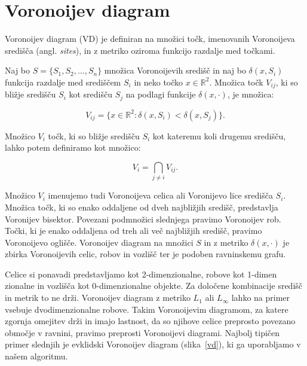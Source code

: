 \documentclass[a4paper, 12pt]{book}
\begin{document}
\section{Voronoijev diagram}
Voronoijev diagram (VD) je definiran na množici točk, imenovanih Voronoijeva središča (angl. \textit{sites}), in z metriko oziroma funkcijo razdalje med točkami.

Naj bo $S = \{S_1,S_2,...,S_n\}$ množica Voronoijevih središč in naj bo $\delta(x,S_i)$ funkcija razdalje med središčem $S_i$ in neko točko $x \in \mathbb{R}^2$. Množica točk $V_{ij}$, ki so bližje središču $S_i$ kot središču $S_j$ na podlagi funkcije $\delta(x,\cdot)$, je množica:

\begin{equation*}
V_{ij} = \{x \in \mathbb{R}^2: \delta(x,S_i) < \delta(x,S_j)\}. 
\end{equation*}

Množico $V_i$ točk, ki so bližje središču $S_i$ kot kateremu koli drugemu središču, lahko potem definiramo kot množico:

\begin{equation*}
V_i = \bigcap_{j \neq i} V_{ij} .
\end{equation*}

Množico $V_i$ imenujemo tudi Voronoijeva celica ali Voronijevo lice središča $S_i$. Množica točk, ki so enako oddaljene od dveh najbližjih središč, predstavlja Voronijev bisektor. Povezani podmnožici slednjega pravimo Voronoijev rob. Točki, ki je enako oddaljena od treh ali več najbližjih središč, pravimo Voronoijevo oglišče. Voronoijev diagram na množici $S$ in z metriko $\delta(x,\cdot)$ je zbirka Voronoijevih celic, robov in vozlišč ter je podoben ravninskemu grafu.

Celice si ponavadi predstavljamo kot 2-dimenzionalne, robove kot 1-dimen\- zionalne in vozlišča kot 0-dimenzionalne objekte. Za določene kombinacije središč in metrik to ne drži. Voronoijev diagram z metriko $L_1$ ali $L_{\infty}$ lahko na primer vsebuje dvodimenzionalne robove. Takim Voronoijevim diagramom, za katere zgornja omejitev drži in imajo lastnost, da so njihove celice preprosto povezano območje v ravnini, pravimo preprosti Voronoijevi diagrami. Najbolj tipičen primer slednjih je evklidski Voronoijev diagram (slika~\ref{vd}), ki ga uporabljamo v našem algoritmu.
\end{document}

